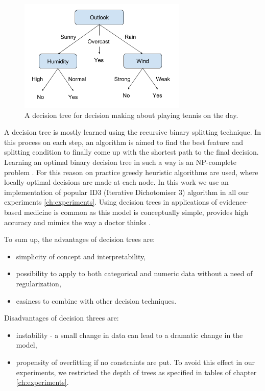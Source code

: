 \begin{figure}[h]
    \centering
    \includegraphics[width=8cm]{Images/Decision-tree.png}
    \caption{A decision tree for decision making about playing tennis on the day.}
    \label{fig:decision-tree}
\end{figure}

A decision tree is mostly learned using the recursive binary splitting technique. In this process on each step, an algorithm is aimed to find the best feature and splitting condition to finally come up with the shortest path to the final decision.
Learning an optimal binary decision tree in such a way is an NP-complete problem \citep{Hyafil-1976}. For this reason on practice greedy heuristic algorithms are used, where locally optimal decisions are made at each node. In this work we use an implementation of popular ID3 (Iterative Dichotomiser 3) algorithm \citep{Quinlan-1986} in all our experiments \ref{ch:experiments}. Using decision trees in applications of evidence-based medicine is common as this model is conceptually simple, provides high accuracy and mimics the way a doctor thinks \citep{Sackett-1996, Podgorelec-2002}.

To sum up, the advantages of decision trees are:
\begin{itemize}
    \item simplicity of concept and interpretability,
    \item possibility to apply to both categorical and numeric data without a need of regularization,
    \item easiness to combine with other decision techniques.
\end{itemize}

Disadvantages of decision threes are:
\begin{itemize}
    \item instability - a small change in data can lead to a dramatic change in the model,
    \item propensity of overfitting if no constraints are put. To avoid this effect in our experiments, we restricted the depth of trees as specified in tables of chapter \ref{ch:experiments}.
\end{itemize}


